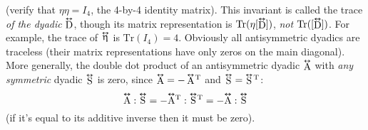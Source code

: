 \documentclass[12pt]{article}
\newcommand{\tightoverset}[2]{%
  \mathop{#2}\limits^{\vbox to -.5ex{\kern-0.75ex\hbox{$#1$}\vss}}}
\newcommand{\inlinedy}[1]{\tightoverset{\text{\tiny$\bm\leftrightarrow$}}{#1}}
\newcommand{\capdy}[1]{ \overset{ \text{\tiny$\bm\leftrightarrow$} }{\vphantom{\text{\small{A}}}\smash{#1}} }
\begin{document}
(verify that $\eta \eta = I_4$, the 4-by-4 identity matrix). This invariant is called the trace \emph{of the dyadic} $\inlinedy{\mathrm{D}}$, though its matrix representation is $\mathrm{Tr} (\eta [ \inlinedy{\mathrm{D}} ])$, \emph{not} $\mathrm{Tr} ( [ \inlinedy{\mathrm{D}} ] )$. For example, the trace of $\inlinedy{\upeta}$ is $\mathrm{Tr} (I_4) = 4$. Obviously all antisymmetric dyadics are traceless (their matrix representations have only zeros on the main diagonal). More generally, the double dot product of an antisymmetric dyadic $\inlinedy{\mathrm{A}}$ with \emph{any symmetric} dyadic $\inlinedy{\mathrm{S}}$ is zero, since $\inlinedy{\mathrm{A}} = - \inlinedy{\mathrm{A}} \mkern-2mu ^\mathrm{T}$ and $\inlinedy{\mathrm{S}} = \inlinedy{\mathrm{S}} \mkern-2mu^\mathrm{T}$:
\begin{equation*}
\capdy{\mathrm{A}} : \capdy{\mathrm{S}} = - \capdy{\mathrm{A}} \mkern0mu ^\mathrm{T} : \capdy{\mathrm{S}} \mkern0mu ^\mathrm{T} = - \capdy{\mathrm{A}} : \capdy{\mathrm{S}}
\end{equation*}
(if it's equal to its additive inverse then it must be zero).
\end{document}
